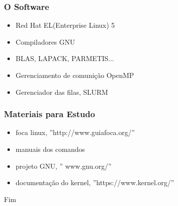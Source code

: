 \documentclass{beamer}
\begin{document}
\begin{frame}
    \frametitle{O Software}
    \begin{itemize}
        \item Red Hat EL(Enterprise Linux) 5
        \item Compiladores GNU
        \item BLAS, LAPACK, PARMETIS...
        \item Gerenciamento de comunição OpenMP
        \item Gerenciador das filas, SLURM
    \end{itemize}
\end{frame}

\begin{frame}
    \frametitle{Materiais para Estudo}

    \begin{itemize}
        \item foca linux, ''http://www.guiafoca.org/'' 
        \item manuais dos comandos
        \item projeto GNU, '' www.gnu.org/''
        \item documentação do kernel, ''https://www.kernel.org/''
    \end{itemize}
\end{frame}

\begin{frame}
\Huge{\centerline{Fim}}
\end{frame}
\end{document}
